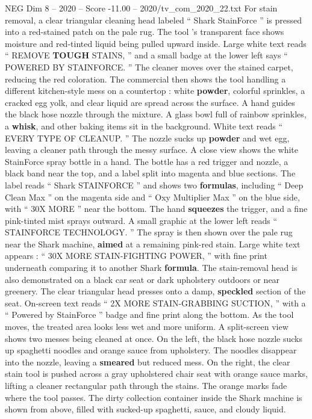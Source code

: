 \begin{textsample}{NEG Dim 8 – 2020 – Score -11.00 – 2020/tv\_com\_2020\_22.txt}
For stain removal, a clear triangular cleaning head labeled “ Shark StainForce ” is pressed into a red-stained patch on the pale rug.
The tool ’s transparent face shows moisture and red-tinted liquid being pulled upward inside.
Large white text reads “ REMOVE \textbf{TOUGH} STAINS, ” and a small badge at the lower left says “ POWERED BY STAINFORCE. ” The cleaner moves over the stained carpet, reducing the red coloration.
The commercial then shows the tool handling a different kitchen-style mess on a countertop : white \textbf{powder}, colorful sprinkles, a cracked egg yolk, and clear liquid are spread across the surface.
A hand guides the black hose nozzle through the mixture.
A glass bowl full of rainbow sprinkles, a \textbf{whisk}, and other baking items sit in the background.
White text reads “ EVERY TYPE OF CLEANUP. ” The nozzle sucks up \textbf{powder} and wet egg, leaving a cleaner path through the messy surface.
A close view shows the white StainForce spray bottle in a hand.
The bottle has a red trigger and nozzle, a black band near the top, and a label split into magenta and blue sections.
The label reads “ Shark STAINFORCE ” and shows two \textbf{formulas}, including “ Deep Clean Max ” on the magenta side and “ Oxy Multiplier Max ” on the blue side, with “ 30X MORE ” near the bottom.
The hand \textbf{squeezes} the trigger, and a fine pink-tinted mist sprays outward.
A small graphic at the lower left reads “ STAINFORCE TECHNOLOGY. ” The spray is then shown over the pale rug near the Shark machine, \textbf{aimed} at a remaining pink-red stain.
Large white text appears : “ 30X MORE STAIN-FIGHTING POWER, ” with fine print underneath comparing it to another Shark \textbf{formula}.
The stain-removal head is also demonstrated on a black car seat or dark upholstery outdoors or near greenery.
The clear triangular head presses onto a damp, \textbf{speckled} section of the seat.
On-screen text reads “ 2X MORE STAIN-GRABBING SUCTION, ” with a “ Powered by StainForce ” badge and fine print along the bottom.
As the tool moves, the treated area looks less wet and more uniform.
A split-screen view shows two messes being cleaned at once.
On the left, the black hose nozzle sucks up spaghetti noodles and orange sauce from upholstery.
The noodles disappear into the nozzle, leaving a \textbf{smeared} but reduced mess.
On the right, the clear stain tool is pushed across a gray upholstered chair seat with orange sauce marks, lifting a cleaner rectangular path through the stains.
The orange marks fade where the tool passes.
The dirty collection container inside the Shark machine is shown from above, filled with sucked-up spaghetti, sauce, and cloudy liquid.

\end{textsample}
